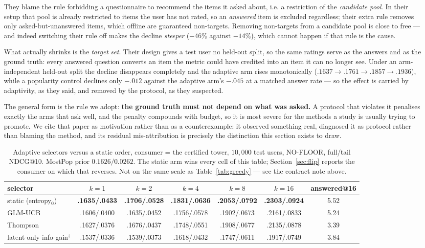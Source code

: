\documentclass[11pt]{article}
\begin{document}
They blame the rule forbidding a questionnaire to recommend the items it asked about, i.e. a
restriction of the \emph{candidate pool}. In their setup that pool is already restricted to items
the user has not rated, so an \emph{answered} item is excluded regardless; their extra rule removes
only asked-but-unanswered items, which offline are guaranteed non-targets. Removing non-targets from
a candidate pool is close to free --- and indeed switching their rule off makes the decline
\emph{steeper} ($-46\%$ against $-14\%$), which cannot happen if that rule is the cause.

What actually shrinks is the \emph{target set}. Their design gives a test user no held-out split, so
the same ratings serve as the answers and as the ground truth: every answered question converts an
item the metric could have credited into an item it can no longer see. Under an arm-independent
held-out split the decline disappears completely and the adaptive arm rises monotonically
($.1637 \to .1761 \to .1857 \to .1936$), while a popularity control declines only $-.012$ against
the adaptive arm's $-.045$ at a matched answer rate --- so the effect is carried by adaptivity, as
they said, and removed by the protocol, as they suspected.

The general form is the rule we adopt: \textbf{the ground truth must not depend on what was asked.}
A protocol that violates it penalises exactly the arms that ask well, and the penalty compounds with
budget, so it is most severe for the methods a study is usually trying to promote. We cite that
paper as motivation rather than as a counterexample: it observed something real, diagnosed it as
protocol rather than blaming the method, and its residual mis-attribution is precisely the
distinction this section exists to draw.

\begin{table}[t]
\centering
\caption{Adaptive selectors versus a static order, consumer = the certified tower, $10{,}000$ test
users, NO-FLOOR, full/tail NDCG@10. MostPop prior $0.1626/0.0262$. The static arm wins every cell
of this table; Section~\ref{sec:flip} reports the consumer on which that reverses. Not on the same
scale as Table~\ref{tab:greedy} --- see the contract note above.}
\label{tab:act1}
\footnotesize
\setlength{\tabcolsep}{3pt}
\begin{tabular}{lccccc c}
\toprule
selector & $k{=}1$ & $k{=}2$ & $k{=}4$ & $k{=}8$ & $k{=}16$ & answered@16 \\
\midrule
static (entropy$_0$) & \textbf{.1635/.0433} & \textbf{.1706/.0528} & \textbf{.1831/.0636} & \textbf{.2053/.0792} & \textbf{.2303/.0924} & 5.52 \\
GLM-UCB & .1606/.0400 & .1635/.0452 & .1756/.0578 & .1902/.0673 & .2161/.0833 & 5.24 \\
Thompson & .1627/.0376 & .1676/.0437 & .1748/.0551 & .1908/.0677 & .2135/.0878 & 3.39 \\
latent-only info-gain$^\dagger$ & .1537/.0336 & .1539/.0373 & .1618/.0432 & .1747/.0611 & .1917/.0749 & 3.84 \\
\bottomrule
\end{tabular}
\end{table}
\end{document}
